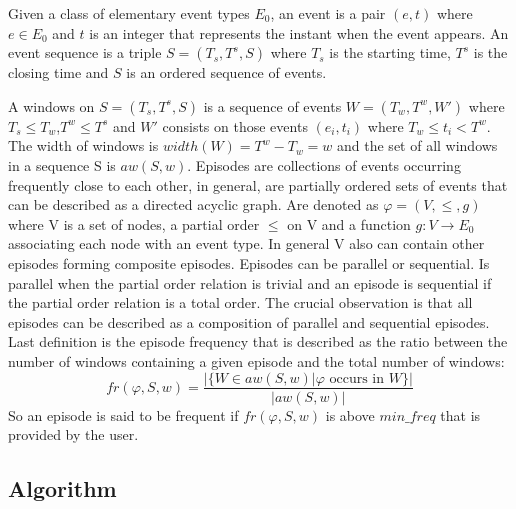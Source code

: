 Given a class of elementary event types $E_{0}$, an event is a pair $(e,t)$
where $e \in E_{0}$ and $t$ is an integer that represents the instant when
the event appears. An event sequence is a triple $S=(T_{s},T^{s},S)$ where
$T_{s}$ is the starting time, $T^{s}$ is the closing time and $S$ is an ordered
sequence of events.

A windows on $S=(T_{s},T^{s},S)$ is a sequence of events $W=(T_{w},T^{w},W')$
where $T_{s} \leq T_{w}$,$T^{w} \leq T^{s}$ and $W'$ consists on those events
$(e_{i},t_{i})$ where $T_{w} \leq t_{i} < T^{w}$. The width of windows is
$width(W)=T^{w}-T_{w}=w$ and the set of all windows in a sequence S is
$aw(S,w)$. Episodes are collections of events occurring frequently 
close to each other, in
general, are partially ordered sets of events that can be described as a
directed acyclic graph. Are denoted as $\varphi =(V,\le,g)$ where V is a set of
nodes, a partial order $\le$ on V and a function $g:V \rightarrow E_{0}$
associating each node with an event type. In general V also can contain other
episodes forming composite episodes. Episodes can be parallel or sequential.
Is parallel when the partial order relation is trivial and an episode is
sequential if the partial order relation is a total order. The crucial
observation is that all episodes can be described as a composition of parallel
and sequential episodes. Last definition is the episode frequency that 
is described as the ratio between the number of windows containing a given 
episode and the total number of windows:
$$
fr(\varphi,S,w)=\frac{|\text{\{}W \in aw(S,w) | \varphi \text{ occurs in }
W\text{\}}|}{|aw(S,w)|}
$$
So an episode is said to be frequent if $fr(\varphi,S,w)$ is above $min\text{\_}freq$
that is provided by the user.

\subsection{Algorithm}

